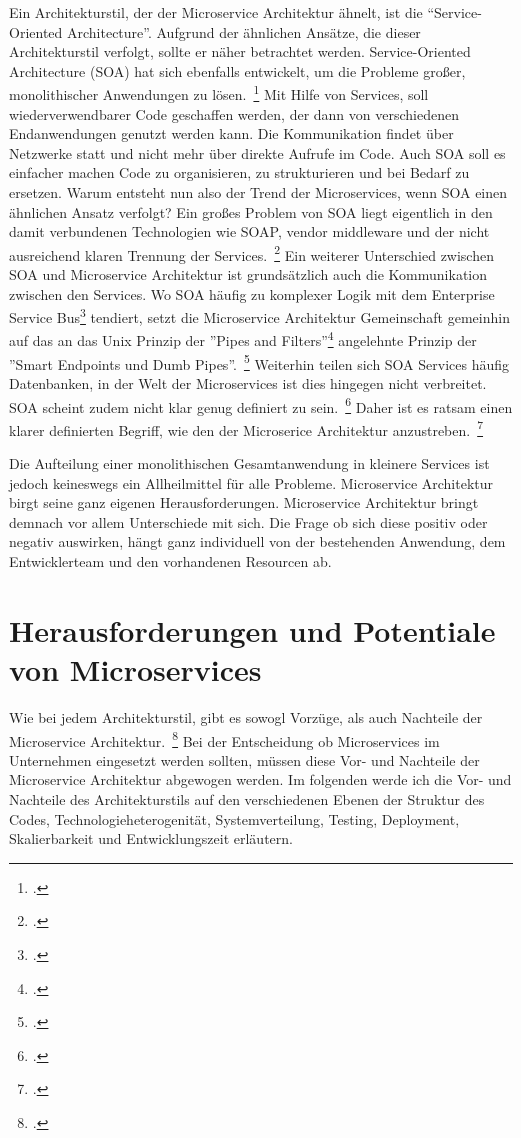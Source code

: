 Ein Architekturstil, der der Microservice Architektur ähnelt, ist die ``Service-Oriented Architecture''. Aufgrund der ähnlichen Ansätze, die dieser Architekturstil verfolgt, sollte er näher betrachtet werden.
Service-Oriented Architecture (SOA) hat sich ebenfalls entwickelt, um die Probleme großer, monolithischer Anwendungen zu lösen.~\footcite[][Seite 8]{newman2015building} Mit Hilfe von Services, soll wiederverwendbarer Code geschaffen werden, der dann von verschiedenen Endanwendungen genutzt werden kann. Die Kommunikation findet über Netzwerke statt und nicht mehr über direkte Aufrufe im Code. Auch SOA soll es einfacher machen Code zu organisieren, zu strukturieren und bei Bedarf zu ersetzen. Warum entsteht nun also der Trend der Microservices, wenn SOA einen ähnlichen Ansatz verfolgt? Ein großes Problem von SOA liegt eigentlich in den damit verbundenen Technologien wie SOAP, vendor middleware und der nicht ausreichend klaren Trennung der Services.~\footcite[][Seite 8]{newman2015building} 
Ein weiterer Unterschied zwischen SOA und Microservice Architektur ist grundsätzlich auch die Kommunikation zwischen den Services. Wo SOA häufig zu komplexer Logik mit dem Enterprise Service Bus\footcite[][]{esb} tendiert, setzt die Microservice Architektur Gemeinschaft gemeinhin auf das an das Unix Prinzip der ''Pipes and Filters''\footcite[vgl.][]{microsoft:pipes} angelehnte Prinzip der ''Smart Endpoints und Dumb Pipes''.~\footcite[vgl.][]{Fowler:Intro}
Weiterhin teilen sich SOA Services häufig Datenbanken, in der Welt der Microservices ist dies hingegen nicht verbreitet. SOA scheint zudem nicht klar genug definiert zu sein.~\footcite[vgl.][]{Fowler:Intro} Daher ist es ratsam einen klarer definierten Begriff, wie den der Microserice Architektur anzustreben.~\footcite[][]{Fowler:Intro}

Die Aufteilung einer monolithischen Gesamtanwendung in kleinere Services ist jedoch keineswegs ein Allheilmittel für alle Probleme. Microservice Architektur birgt seine ganz eigenen Herausforderungen. Microservice Architektur bringt demnach vor allem Unterschiede mit sich. Die Frage ob sich diese positiv oder negativ auswirken, hängt ganz individuell von der bestehenden Anwendung, dem Entwicklerteam und den vorhandenen Resourcen ab.

\section{Herausforderungen und Potentiale von Microservices}
Wie bei jedem Architekturstil, gibt es sowogl Vorzüge, als auch Nachteile der Microservice Architektur.~\footcite[vgl.][]{Fowler:Guide}
Bei der Entscheidung ob Microservices im Unternehmen eingesetzt werden sollten, müssen diese Vor- und Nachteile der Microservice Architektur abgewogen werden.
Im folgenden werde ich die Vor- und Nachteile des Architekturstils auf den verschiedenen Ebenen der Struktur des Codes, Technologieheterogenität, Systemverteilung, Testing, Deployment, Skalierbarkeit und Entwicklungszeit erläutern.

